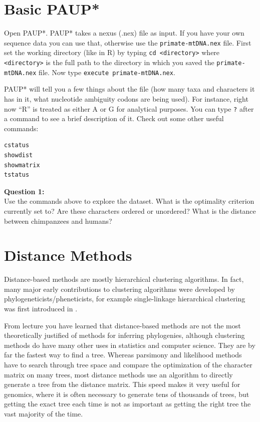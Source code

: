 \documentclass[11pt]{article}
\begin{document}
\section{Basic PAUP*}

Open PAUP*.
PAUP* takes a nexus (.nex) file as input. 
If you have your own sequence data you can use that, 
otherwise use the \texttt{primate-mtDNA.nex} file.
First set the working directory (like in R)
by typing \texttt{cd <directory>} where \texttt{<directory>}
is the full path to the directory in which you saved
the \texttt{primate-mtDNA.nex} file.
Now type \texttt{execute primate-mtDNA.nex}.

PAUP* will tell you a few things about the file (how many taxa and characters it has in it, what nucleotide ambiguity codons are being used). For instance, right now “R” is treated as either A or G for analytical purposes.
You can type \texttt{?} after a command to see a brief description of it. Check
out some other useful commands:

\begin{verbatim}
cstatus
showdist
showmatrix
tstatus
\end{verbatim}

\begin{framed}
\noindent
\textbf{Question 1:} \\
Use the commands above to explore the dataset.
What is the optimality criterion currently set to? Are these characters
ordered or unordered?
What is the distance between chimpanzees and humans? %
\end{framed}

\section{Distance Methods}

Distance-based methods are mostly hierarchical clustering algorithms.
In fact, many major early contributions to clustering algorithms were
developed by phylogeneticists/pheneticists, for example single-linkage hierarchical clustering
was first introduced in \citet{sneath1957application}.

From lecture you have learned that distance-based methods are not the most theoretically justified of methods for inferring phylogenies, although clustering methods do have many other uses in statistics and computer science. 
They are by far the fastest way to find a tree. Whereas parsimony and likelihood methods have to search through tree space and compare the optimization of the character matrix on many trees, most distance methods use an algorithm to directly generate a tree from the distance matrix. This speed makes it very useful for genomics, where it is often necessary to generate tens of thousands of trees, but getting the exact tree each time is not as important as getting the right tree the vast majority of the time.
\end{document}
